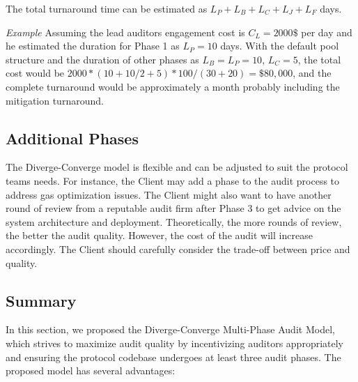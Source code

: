 \documentclass[10pt]{extarticle}
\begin{document}
The total turnaround time can be estimated as
\(L_P + L_B + L_C + L_J + L_F\) days.

\emph{Example} Assuming the lead auditor\textquotesingle s engagement
cost is \(C_L = 2000\$\) per day and he estimated the duration for Phase
1 as \(L_P = 10\) days. With the default pool structure and the duration
of other phases as \(L_B = L_P = 10\), \(L_C = 5\), the total cost would
be \(2000 * (10 + 10/2 + 5) * 100 / (30 + 20) = \$80,000\), and the
complete turnaround would be approximately a month probably including
the mitigation turnaround.

\subsection{ Additional Phases}\label{47-additional-phases}

The Diverge-Converge model is flexible and can be adjusted to suit the
protocol team\textquotesingle s needs. For instance, the Client may add
a phase to the audit process to address gas optimization issues. The
Client might also want to have another round of review from a reputable
audit firm after Phase 3 to get advice on the system architecture and
deployment. Theoretically, the more rounds of review, the better the
audit quality. However, the cost of the audit will increase accordingly.
The Client should carefully consider the trade-off between price and
quality.

\subsection{ Summary}\label{48-summary}

In this section, we proposed the Diverge-Converge Multi-Phase Audit
Model, which strives to maximize audit quality by incentivizing auditors
appropriately and ensuring the protocol codebase undergoes at least
three audit phases. The proposed model has several advantages:
\end{document}
